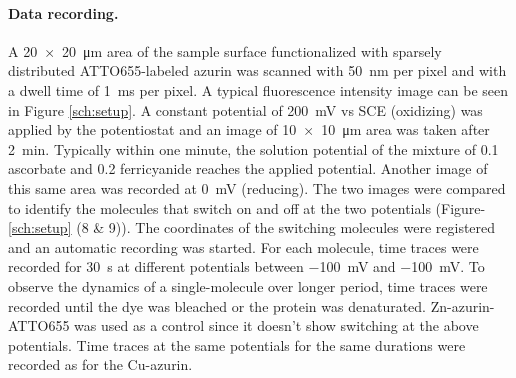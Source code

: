 \paragraph*{Data recording.}
A \SI[product-units=repeat]{20x20}{\um} area of the sample surface functionalized with sparsely distributed ATTO655-labeled azurin was scanned with \SI{50}{\nm} per pixel and with a dwell time of \SI{1}{\ms} per pixel.
A typical fluorescence intensity image can be seen in Figure \ref{sch:setup}.
A constant potential of \SI{200}{\mV} vs SCE (oxidizing) was applied by the potentiostat and an image of \SI[product-units=repeat]{10x10}{\um} area was taken after \SI{2}{\minute}.
Typically within one minute, the solution potential of the mixture of \SI{0.1}{\mM} ascorbate and \SI{0.2}{\mM} ferricyanide reaches the applied potential.
Another image of this same area was recorded at \SI{0}{\mV} (reducing).
The two images were compared to identify the molecules that switch on and off at the two potentials (Figure-\ref{sch:setup} (8 \& 9)).
The coordinates of the switching molecules were registered and an automatic recording was started.
For each molecule, time traces were recorded for \SI{30}{\s} at different potentials between \SI{-100}{\mV} and \SI{-100}{\mV}.
To observe the dynamics of a single-molecule over longer period, time traces were recorded until the dye was  bleached or the protein was denaturated.
Zn-azurin-ATTO655 was used as a control since it doesn't show switching at the above potentials.
Time traces at the same potentials for the same durations were recorded as for the Cu-azurin.


